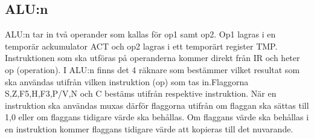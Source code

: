 \documentclass[main.tex]{subfiles}
\begin{document}
\subsection{ALU:n}
 ALU:n tar in två operander som kallas för op1 samt op2. Op1 lagras i en
 temporär ackumulator ACT och op2 lagras i ett temporärt register TMP.
 Instruktionen som ska utföras på operanderna kommer direkt från IR och heter
 op (operation). I ALU:n finns det 4 räknare som bestämmer vilket resultat som
 ska användas utifrån vilken instruktion (op) som tas in.Flaggorna 
 S,Z,F5,H,F3,P/V,N och C bestäms utifrån respektive instruktion. När en
 instruktion ska användas muxas därför flaggorna utifrån om flaggan ska sättas
 till 1,0 eller om flaggans tidigare värde ska behållas. Om flaggans värde ska
 behållas i en instruktion kommer flaggans tidigare värde att kopieras till det
 nuvarande.
\end{document}
